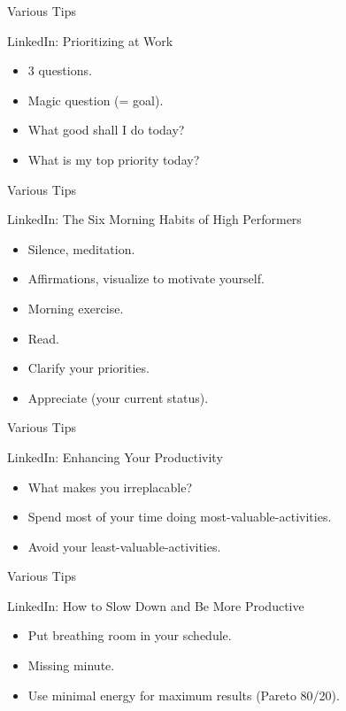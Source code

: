 \begin{frame}{Various Tips}
  \begin{block}{LinkedIn: Prioritizing at Work}
    \begin{itemize}
      \item 3 questions.
      \item Magic question (= goal).
      \item What good shall I do today?
      \item What is my top priority today?
    \end{itemize}
  \end{block}
\end{frame}

\begin{frame}{Various Tips}
  \begin{block}{LinkedIn: The Six Morning Habits of High Performers}
    \begin{itemize}
      \item Silence, meditation.
      \item Affirmations, visualize to motivate yourself.
      \item Morning exercise. 
      \item Read. 
      \item Clarify your priorities.
      \item Appreciate (your current status).
    \end{itemize}
  \end{block}
\end{frame}

\begin{frame}{Various Tips}
  \begin{block}{LinkedIn: Enhancing Your Productivity}
    \begin{itemize}
      \item What makes you irreplacable?
      \item Spend most of your time doing most-valuable-activities.
      \item Avoid your least-valuable-activities.
    \end{itemize}
  \end{block}
\end{frame}

\begin{frame}{Various Tips}
  \begin{block}{LinkedIn: How to Slow Down and Be More Productive}
    \begin{itemize}
      \item Put breathing room in your schedule.
      \item Missing minute.
      \item Use minimal energy for maximum results (Pareto 80/20).
    \end{itemize}
  \end{block}
\end{frame}

